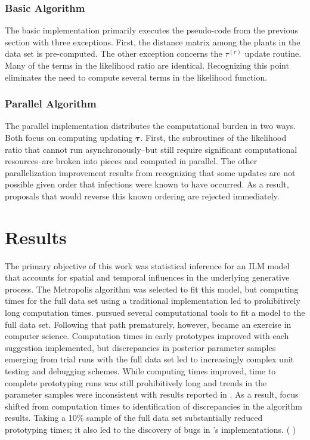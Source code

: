 \documentclass{uwstat572}
\newcommand{\vmcomment}[1]{({\color{blue}{VM's comment:}} \textbf{\color{blue}{#1}})}
\begin{document}
\subsubsection{Basic Algorithm}
The basic implementation primarily executes the pseudo-code from the previous section with three exceptions.
First, the distance matrix among the plants in the data set is pre-computed. 
The other exception concerns the $\tau^{(r)}$ update routine. 
Many of the terms in the likelihood ratio are identical. 
Recognizing this point eliminates the need to compute several terms in the likelihood function. 
 
\subsubsection{Parallel Algorithm}
The parallel implementation distributes the computational burden in two ways. 
Both focus on computing updating $\boldsymbol{\tau}$. 
First, the subroutines of the likelihood ratio that cannot run asynchronously--but still require significant computational resources--are broken into pieces and computed in parallel. 
The other parallelization improvement results from recognizing that some updates are not possible given order that infections were known to have occurred. 
As a result, proposals that would reverse this known ordering are rejected immediately. 

\section{Results}
The primary objective of this work was statistical inference for an ILM model that accounts for spatial and temporal influences in the underlying generative process. 
The Metropolis algorithm was selected to fit this model, but computing times for the full data set using a traditional implementation led to prohibitively long computation times. 
\citet{Brown} pursued several computational tools to fit a model to the full data set. 
Following that path prematurely, however, became an exercise in computer science. 
Computation times  in early prototypes improved with each suggestion implemented, but discrepancies in posterior parameter samples emerging from trial runs with the full data set led to increasingly complex unit testing and debugging schemes. 
While computing times improved, time to complete prototyping runs was still prohibitively long and trends in the parameter samples were inconsistent with results reported in \citet{Brown}. 
As a result, focus shifted from computation times to identification of discrepancies in the algorithm results. 
Taking a 10\% sample of the full data set substantially reduced prototyping times; it also led to the discovery of bugs in \citet{Brown}'s implementations. 
\vmcomment{Shorten the above discussion of computing time and subsampling to a couple of sentences. You are too apologetic right now.}
\end{document}
